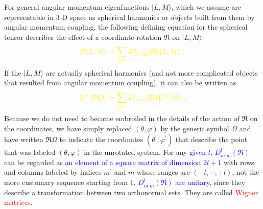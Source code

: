 \documentclass[12pt,a4paper]{article}
\begin{document}
For general angular momentum eigenfunctions $|L, M\rangle$, which we assume are representable in $3$-D space as spherical harmonics or objects built from them by angular momentum coupling, the following defining equation for the spherical tensor describes the effect of a coordinate rotation $\mathfrak R$ on $|L, M\rangle$:
\begin{equation}
\color{yellow} {\mathfrak R} |L, M\rangle = \sum_{M^\prime} D^L_{M^\prime M} (\mathfrak R) |L, M\rangle ~.
\end{equation}
If the $|L, M\rangle$ are actually spherical harmonics (and not more complicated objects that resulted from angular momentum coupling), it can also be written as
\begin{equation}
\color{yellow} Y_l^m (\mathfrak R \Omega) = \sum_{m^\prime} D^l_{m^\prime m}(\mathfrak R) Y_l^{m^\prime} ( \Omega) ~.
\label{eq:spherical_tensor}
\end{equation}
Because we do not need to become embroiled in the details of the action of ${\mathfrak R}$ on the coordinates, we have simply replaced $(\theta, \varphi)$ by the generic symbol $\Omega$ and have written ${\mathfrak R} \Omega$ to indicate the coordinates $(\theta^\prime, \varphi^\prime)$ that describe the point that was labeled $(\theta, \varphi)$ in the unrotated system. For any \textcolor{blue}{given $l$}, \textcolor{blue}{$D^l_{m^\prime m}(\mathfrak R)$} can be regarded as \textcolor{blue}{an element of a square matrix of dimension $2l+1$} with rows and columns labeled by indices $m^\prime$ and $m$ whose ranges are $(-l, \cdots, +l)$, not the more customary sequence starting from $1$. \textcolor{blue}{$D^l_{m^\prime m}(\mathfrak R)$ are unitary}, since they describe a transformation between two orthonormal sets. They are called \textcolor{red}{Wigner matrices}.
\end{document}
